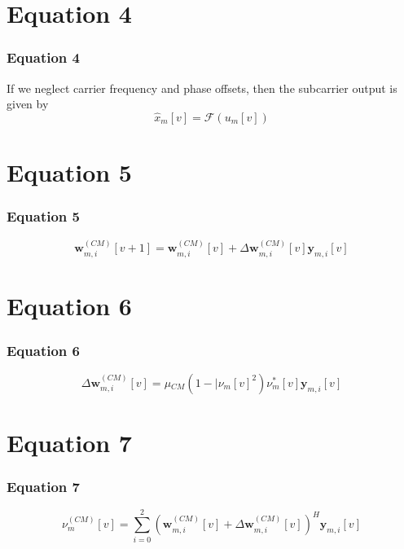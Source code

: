 \documentclass{beamer}
\theoremstyle{remark}
\let\vec\mathbf
\begin{document}
\section{Equation 4}
\begin{frame}
\frametitle{Equation 4}
 If we neglect carrier frequency and phase offsets, then the
subcarrier output is given by
  \begin{equation*}
 \hat{x}_m[v] ={\mathcal{F}}(u_m[v])
  \end{equation*}
 \end{frame}
 
 \section{Equation 5}
\begin{frame}
\frametitle{Equation 5}
 \begin{equation*}
\vec{w}^{(CM)}_{m,i}[v+1] = \vec{w}^{(CM)}_{m,i}[v] + \Delta{\vec{w}^{(CM)}_{m,i}[v]}\vec{y}_{m,i}[v]
 \end{equation*}
 \end{frame}
  
   \section{Equation 6}
\begin{frame}
\frametitle{Equation 6}
 \begin{equation*}
\Delta{\vec{w}^{(CM)}_{m,i}[v]} = \mu{_{CM}}(1 - \mid{{\nu_m[v]}^2}){\nu^*_m[v]}\vec{y}_{m,i}[v]
\end{equation*}
  \end{frame}
  
   \section{Equation 7}
\begin{frame}
\frametitle{Equation 7}
 \begin{equation*}
{\nu^{(CM)}_m[v]} = \sum_{i=0}^{2} (\vec{w}^{(CM)}_{m,i}[v] + \Delta{\vec{w}^{(CM)}_{m,i}[v]})^{H}\vec{y}_{m,i}[v]
\end{equation*}
  \end{frame}
  
\end{document}
